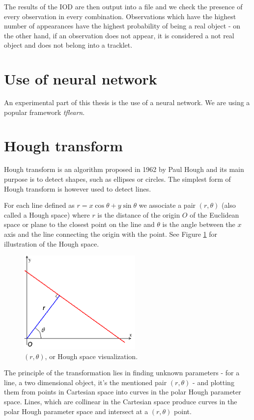 	 The results of the IOD are then output into a file and we check the presence of every observation in every combination. Observations which have the highest number of appearances have the highest probability of being a real object - on the other hand, if an observation does not appear, it is considered a not real object and does not belong into a tracklet.

\section{Use of neural network}\label{sec:neural}

	An experimental part of this thesis is the use of a neural network. We are using a popular framework \emph{tflearn}.

\section{Hough transform}\label{sec:hough}

	Hough transform is an algorithm proposed in 1962 by Paul Hough and its main purpose is to detect shapes, such as ellipses or circles. The simplest form of Hough transform is however used to detect lines.
	
	For each line defined as $r=x\cos\theta+y\sin\theta$ we associate a pair $(r,\theta)$ (also called a Hough space) where $r$ is the distance of the origin $O$ of the Euclidean space or plane to the closest point on the line and $\theta$ is the angle between the $x$ axis and the line connecting the origin with the point. See Figure \ref{fig:rtheta} for illustration of the Hough space.
	
	\begin{figure}[H]
	\centering
	  \includegraphics[width=6cm]{images/rtheta}
		  \caption{$(r,\theta)$, or Hough space visualization.}
	  \label{fig:rtheta}
	\end{figure}
	
	The principle of the transformation lies in finding unknown parameters - for a line, a two dimensional object, it's the mentioned pair $(r,\theta)$ - and plotting them from points in Cartesian space into curves in the polar Hough parameter space. Lines, which are collinear in the Cartesian space produce curves in the polar Hough parameter space and intersect at a $(r,\theta)$ point. 
	
